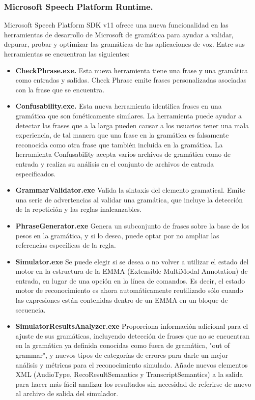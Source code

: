 \documentclass[11pt,a4paper]{article}
\begin{document}
\subsubsection{Microsoft Speech Platform Runtime.}
Microsoft Speech Platform SDK v11 ofrece una nueva funcionalidad en las herramientas de desarrollo de Microsoft de gramática para ayudar a validar, depurar, probar y optimizar las gramáticas de las aplicaciones de voz. Entre sus herramientas se encuentran las siguientes:
\begin{itemize}
\item \textbf{CheckPhrase.exe.} Esta nueva herramienta tiene una frase y una gramática como entradas y salidas. Check Phrase emite frases personalizadas asociadas con la frase que se encuentra.
\item \textbf{Confusability.exe.} Esta nueva herramienta identifica frases en una gramática que son fonéticamente similares. La herramienta puede ayudar a detectar las frases que a la larga pueden causar a los usuarios tener una mala experiencia, de tal manera que una frase en la gramática es falsamente reconocida como otra frase que también incluida en la gramática. La herramienta Confusability acepta varios archivos de gramática como de entrada y realiza su análisis en el conjunto de archivos de entrada especificados.
\item \textbf{GrammarValidator.exe} Valida la sintaxis del elemento gramatical. Emite una serie de advertencias al validar una gramática, que incluye la detección de la repetición y las reglas inalcanzables.
\item \textbf{PhraseGenerator.exe} Genera un subconjunto de frases sobre la base de los pesos en la gramática, y si lo desea, puede optar por no ampliar las referencias específicas de la regla.
\item \textbf{Simulator.exe} Se puede elegir si se desea o no volver a utilizar el estado del motor en la estructura de la EMMA (Extensible MultiModal Annotation) de entrada, en lugar de una opción en la línea de comandos. Es decir, el estado motor de reconocimiento es ahora automáticamente reutilizado sólo cuando las expresiones están contenidas dentro de un EMMA en un bloque de secuencia. 
\item \textbf{SimulatorResultsAnalyzer.exe} Proporciona información adicional para el ajuste de sus gramáticas, incluyendo detección de frases que no se encuentran en la gramática ya definida conocidas como fuera de gramática, "out of grammar", y nuevos tipos de categorías de errores para darle un mejor análisis y métricas para el reconocimiento simulado. Añade nuevos elementos XML (AudioType, RecoResultSemantics y TranscriptSemantics) a la salida para hacer más fácil analizar los resultados sin necesidad de referirse de nuevo al archivo de salida del simulador.
\end{itemize} 
\end{document}
